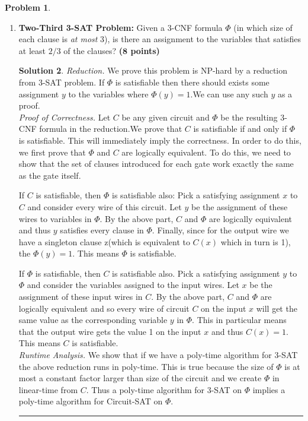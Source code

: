 \documentclass{article}
\theoremstyle{definition}
\newtheorem{problem}{Problem}
\def\fline{\rule{0.75\linewidth}{0.5pt}}
\newcommand{\finishline}{\begin{center}\fline\end{center}}
\newtheorem*{solution*}{Solution}
\newenvironment{solution}{\begin{solution*}}{{\finishline} \end{solution*}}
\newcommand{\grade}[1]{\hfill{\textbf{($\mathbf{#1}$ points)}}}
\begin{document}
\begin{problem}
\begin{enumerate}[label=(\alph*)]
\begin{solution}
\end{solution}

	\item \textbf{Two-Third 3-SAT Problem:} Given a 3-CNF formula $\Phi$ (in which size of each clause is \emph{at most} $3$), is there an assignment to the variables that satisfies at least $2/3$ of the clauses?  \grade{8}

\begin{solution}

	\emph{Reduction.} We prove this problem is NP-hard by a reduction from 3-SAT problem. If $\Phi$ is satisfiable then there should exists some assignment $y$ to the variables where $\Phi(y) = 1$.We can use any such $y$ as a proof. \\
	
	\emph{Proof of Correctness.} Let $C$ be any given circuit and $\Phi$ be the resulting 3-CNF formula in the reduction.We prove that $C$ is satisfiable if and only if $\Phi$ is satisfiable.  This will immediately imply the correctness. In order to do this, we first prove that $\Phi$ and $C$ are logically equivalent.  To do this, we need to show that the set of clauses introduced for each gate work exactly the same as the gate itself. 
	
	If $C$ is satisfiable, then $\Phi$ is satisfiable also:  Pick a satisfying assignment $x$ to $C$ and consider every wire of this circuit.  Let $y$ be the assignment of these wires to variables in $\Phi$.  By the above part, $C$ and $\Phi$ are logically equivalent and thus $y$ satisfies every clause in $\Phi$.  Finally, since for the output wire we have a singleton clause z(which is equivalent to $C(x)$ which in turn is 1), the $\Phi(y) = 1$.  This means $\Phi$ is satisfiable.
	
	If  $\Phi$  is  satisfiable,  then $C$ is  satisfiable  also.   Pick  a  satisfying  assignment $y$ to  $\Phi$  and  consider  the variables assigned to the input wires.  Let $x$ be the assignment of these input wires in $C$.  By the above part, $C$ and $\Phi$ are logically equivalent and so every wire of circuit $C$ on the input $x$ will get the same value as the corresponding variable $y$ in $\Phi$.  This in particular means that the output wire gets the value 1 on the input $x$ and thus $C(x) = 1$.  This means $C$ is satisfiable. \\
	
	\emph{Runtime Analysis.} We show that if we have a poly-time algorithm for 3-SAT the above reduction runs in poly-time.  This is true because the size of $\Phi$ is at most a constant factor larger than size of the circuit and we create $\Phi$ in linear-time from $C$.  Thus a poly-time algorithm for 3-SAT on $\Phi$ implies a poly-time algorithm for Circuit-SAT on $\Phi$. 
	

\end{solution}
\end{enumerate}
\end{problem}
\end{document}

